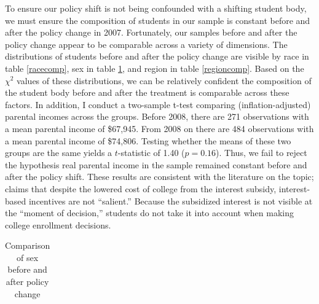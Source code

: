 \documentclass[12pt]{article}
\begin{document}
	To ensure our policy shift is not being confounded with a shifting student body, we must ensure the composition of students in our sample is constant before and after the policy change in 2007. Fortunately, our samples before and after the policy change appear to be comparable across a variety of dimensions. The distributions of students before and after the policy change are visible by race in table \ref{racecomp}, sex in table \ref{sexcomp}, and region in table \ref{regioncomp}. Based on the $\chi^2$ values of these distributions, we can be relatively confident the composition of the student body before and after the treatment is comparable across these factors. In addition, I conduct a two-sample t-test comparing (inflation-adjusted) parental incomes across the groups. Before 2008, there are 271 observations with a mean parental income of \$67,945. From 2008 on there are 484 observations with a mean parental income of \$74,806. Testing whether the means of these two groups are the same yields a $t$-statistic of 1.40 ($p = 0.16$). Thus, we fail to reject the hypothesis real parental income in the sample remained constant before and after the policy shift. These results are consistent with the literature on the topic; \textcite{dynarski2015} claims that despite the lowered cost of college from the interest subsidy, interest-based incentives are not ``salient.'' Because the subsidized interest is not visible at the ``moment of decision,'' students do not take it into account when making college enrollment decisions. 
	
{
	\begin{table}
		\centering
		\caption{Comparison of race before and after policy change}
		\label{racecomp}
	\end{table}

	\begin{table}
		\small
		\centering
		\caption{Comparison of sex before and after policy change}
		\begin{tabular}{lrrrrrr}
			
		\end{tabular}
		\label{sexcomp}
	\end{table}

	\begin{table}
		\centering
		\caption{Comparison of region before and after policy change}
		\label{regioncomp}
	\end{table}
}
	
\end{document}
